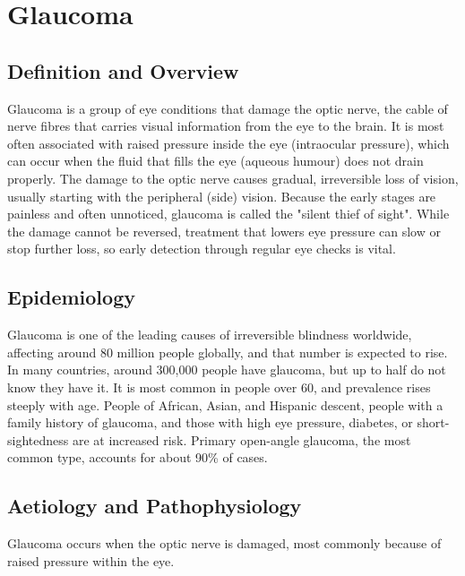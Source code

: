 \chapter{Glaucoma}

\section*{Definition and Overview}
Glaucoma is a group of eye conditions that damage the optic nerve, the cable of nerve fibres that carries visual information from the eye to the brain. It is most often associated with raised pressure inside the eye (intraocular pressure), which can occur when the fluid that fills the eye (aqueous humour) does not drain properly. The damage to the optic nerve causes gradual, irreversible loss of vision, usually starting with the peripheral (side) vision. Because the early stages are painless and often unnoticed, glaucoma is called the "silent thief of sight". While the damage cannot be reversed, treatment that lowers eye pressure can slow or stop further loss, so early detection through regular eye checks is vital.

\section*{Epidemiology}
Glaucoma is one of the leading causes of irreversible blindness worldwide, affecting around 80 million people globally, and that number is expected to rise. In many countries, around 300,000 people have glaucoma, but up to half do not know they have it. It is most common in people over 60, and prevalence rises steeply with age. People of African, Asian, and Hispanic descent, people with a family history of glaucoma, and those with high eye pressure, diabetes, or short-sightedness are at increased risk. Primary open-angle glaucoma, the most common type, accounts for about 90\% of cases.

\section*{Aetiology and Pathophysiology}
Glaucoma occurs when the optic nerve is damaged, most commonly because of raised pressure within the eye.

